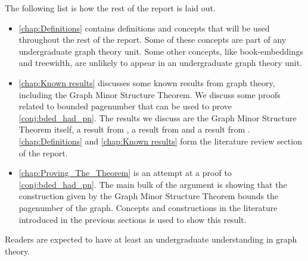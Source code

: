 The following list is how the rest of the report is laid out. 
\begin{itemize}
	\item \cref{chap:Definitions} contains definitions and concepts that will be used throughout the rest of the report. Some of these concepts are part of any undergraduate graph theory unit. Some other concepts, like book-embeddings and treewidth, are unlikely to appear in an undergraduate graph theory unit.
	\item \cref{chap:Known results} discusses some known results from graph theory, including the Graph Minor Structure Theorem. We discuss some proofs related to bounded pagenumber that can be used to prove \cref{conj:bded_had_pn}. The results we discuss are the Graph Minor Structure Theorem itself, a result from \textcite{heathPagenumberGenusGraphs1992}, a result from \textcite{ganleyPagenumberTrees2001} and a result from \textcite{hickingbothamStackNumberCliqueSum2023}. \cref{chap:Definitions} and \cref{chap:Known results} form the literature review section of the report.

	\item \cref{chap:Proving_The_Theorem} is an attempt at a proof to \cref{conj:bded_had_pn}. The main bulk of the argument is showing that the construction given by the Graph Minor Structure Theorem bounds the pagenumber of the graph. Concepts and constructions in the literature introduced in the previous sections is used to show this result. 
\end{itemize}

Readers are expected to have at least an undergraduate understanding in graph theory.
